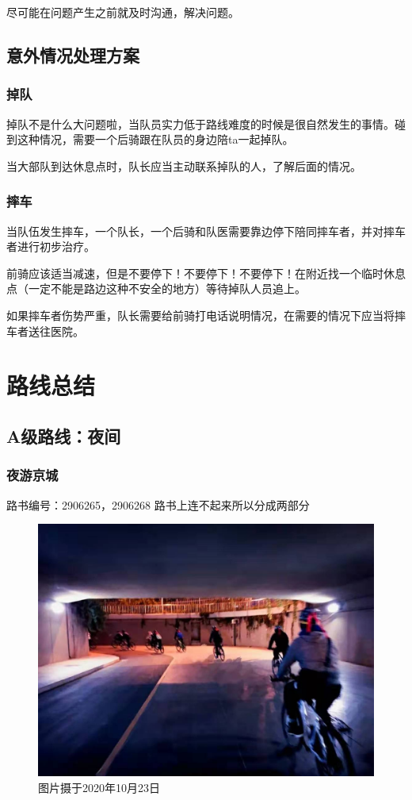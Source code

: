 \documentclass{ctexbook}
\begin{document}
尽可能在问题产生之前就及时沟通，解决问题。
\section{意外情况处理方案}
\subsection{掉队}
掉队不是什么大问题啦，当队员实力低于路线难度的时候是很自然发生的事情。碰到这种情况，需要一个后骑跟在队员的身边陪ta一起掉队。

当大部队到达休息点时，队长应当主动联系掉队的人，了解后面的情况。
\subsection{摔车}
当队伍发生摔车，一个队长，一个后骑和队医需要靠边停下陪同摔车者，并对摔车者进行初步治疗。

前骑应该适当减速，但是不要停下！不要停下！不要停下！在附近找一个临时休息点（一定不能是路边这种不安全的地方）等待掉队人员追上。

如果摔车者伤势严重，队长需要给前骑打电话说明情况，在需要的情况下应当将摔车者送往医院。


\chapter{路线总结}
\section{A级路线：夜间}
\subsection{夜游京城}

路书编号：2906265，2906268 路书上连不起来所以分成两部分

\begin{figure}[htp]
    \centering
    \includegraphics[width=0.7\linewidth]{fig/夜游京城1.jpg}
    \caption{图片摄于2020年10月23日}
\end{figure}
\end{document}
